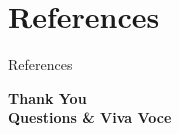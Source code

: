 \documentclass[aspectratio=169, 11pt]{beamer}
\begin{document}
\section{References}
\nocite{*}
\begin{frame}[allowframebreaks]{References}
    
    
\end{frame}

\begin{frame}
    \centering
    {\Huge \textbf{\textcolor{amritaMaroon}{Thank You}}} \\[0.4cm]
    {\large \textbf{Questions \& Viva Voce}}
\end{frame}
\end{document}
